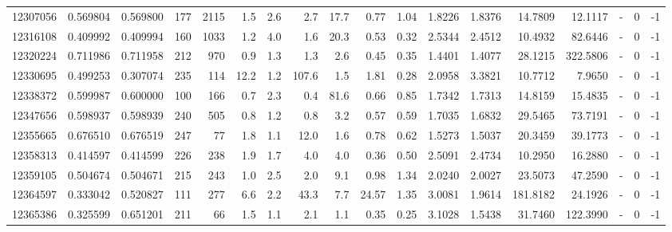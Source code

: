 \begin{tabular}{rrrrrrrrrrrrrrrlrr}
  12307056 & 0.569804 &   0.569800 &  177 & 2115 &      1.5 &      2.6 &     2.7 &     17.7 &       0.77 &        1.04 &  1.8226 &  1.8376 &   14.7809 &   12.1117 &             - &        0 &         -1 \\
  12316108 & 0.409992 &   0.409994 &  160 & 1033 &      1.2 &      4.0 &     1.6 &     20.3 &       0.53 &        0.32 &  2.5344 &  2.4512 &   10.4932 &   82.6446 &             - &        0 &         -1 \\
  12320224 & 0.711986 &   0.711958 &  212 &  970 &      0.9 &      1.3 &     1.3 &      2.6 &       0.45 &        0.35 &  1.4401 &  1.4077 &   28.1215 &  322.5806 &             - &        0 &         -1 \\
  12330695 & 0.499253 &   0.307074 &  235 &  114 &     12.2 &      1.2 &   107.6 &      1.5 &       1.81 &        0.28 &  2.0958 &  3.3821 &   10.7712 &    7.9650 &             - &        0 &         -1 \\
  12338372 & 0.599987 &   0.600000 &  100 &  166 &      0.7 &      2.3 &     0.4 &     81.6 &       0.66 &        0.85 &  1.7342 &  1.7313 &   14.8159 &   15.4835 &             - &        0 &         -1 \\
  12347656 & 0.598937 &   0.598939 &  240 &  505 &      0.8 &      1.2 &     0.8 &      3.2 &       0.57 &        0.59 &  1.7035 &  1.6832 &   29.5465 &   73.7191 &             - &        0 &         -1 \\
  12355665 & 0.676510 &   0.676519 &  247 &   77 &      1.8 &      1.1 &    12.0 &      1.6 &       0.78 &        0.62 &  1.5273 &  1.5037 &   20.3459 &   39.1773 &             - &        0 &         -1 \\
  12358313 & 0.414597 &   0.414599 &  226 &  238 &      1.9 &      1.7 &     4.0 &      4.0 &       0.36 &        0.50 &  2.5091 &  2.4734 &   10.2950 &   16.2880 &             - &        0 &         -1 \\
  12359105 & 0.504674 &   0.504671 &  215 &  243 &      1.0 &      2.5 &     2.0 &      9.1 &       0.98 &        1.34 &  2.0240 &  2.0027 &   23.5073 &   47.2590 &             - &        0 &         -1 \\
  12364597 & 0.333042 &   0.520827 &  111 &  277 &      6.6 &      2.2 &    43.3 &      7.7 &      24.57 &        1.35 &  3.0081 &  1.9614 &  181.8182 &   24.1926 &             - &        0 &         -1 \\
  12365386 & 0.325599 &   0.651201 &  211 &   66 &      1.5 &      1.1 &     2.1 &      1.1 &       0.35 &        0.25 &  3.1028 &  1.5438 &   31.7460 &  122.3990 &             - &        0 &         -1 \\

\end{tabular}
